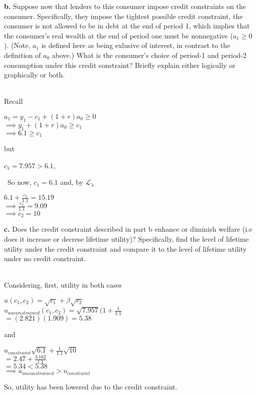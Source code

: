 \documentclass[11pt]{SelfArxOneColBMN}
\begin{document}
\indent \textbf{b. }Suppose now that lenders to this consumer impose credit constraints on the consumer. Specifically, they impose the tightest possible credit constraint, the consumer is not allowed to be in debt at the end of period 1, which implies that the consumer's real wealth at the end of period one must be nonnegative ($a_1 \geq 0$). (Note, $a_1$ is defined here as being exlusive of interest, in contrast to the definition of $a_0$ above.) What is the consumer's choice  of period-1 and period-2 consumption under this credit constraint? Briefly explain either logically or graphically or both.\\
\\
\begin{solution}
  \noindent Recall\\
  \begin{center}
    $a_1 = y_1 - c_1 + (1 + r)a_0 \geq 0$\\
    $\implies y_1 + (1 + r)a_0 \geq c_1$\\
    $\implies 6.1 \geq c_1$
  \end{center}
  but
  \begin{center}
    $c_1 = 7.957 > 6.1$,
  \end{center}\
  So now, $c_1 = 6.1$ and, by $\mathcal{L}_\lambda$
  \begin{center}
    $6.1 + \frac{c_2}{1.1} = 15.19$\\
    $\implies \frac{c_2}{1.1} = 9.09$\\
    $\implies c_2 = 10$
  \end{center}
\end{solution}
\indent \textbf{c.} Does the credit constraint described in part b enhance or diminish welfare (i.e does it increase or decrese lifetime utility)? Specifically, find the level of lifetime utility under the credit constraint and compare it to the level of lifetime utility under no credit constraint.\\
\\
\begin{solution}
Considering, first, utility in both cases
  \begin{center}
    $u(c_1,c_2) = \sqrt{c_1} + \beta\sqrt{c_2}$\\
    $u_{unconstrained}(c_1,c_2) = \sqrt{7.957}(1 + \frac{1}{1.1}$\\
    $= (2.821)(1.909) = 5.38$\\
  \end{center}
  and
  \begin{center}
    $u_{constraint} \sqrt{6.1} + \frac{1}{1.1}\sqrt{10}$\\
    $= 2.47 + \frac{3.162}{1.1}$\\
    $= 5.34 < 5.38$\\
    $\implies u_{unconstrained}> u_{constraint}$
  \end{center}
  So, utility has been lowered due to the credit constraint.
\end{solution}
\end{document}
